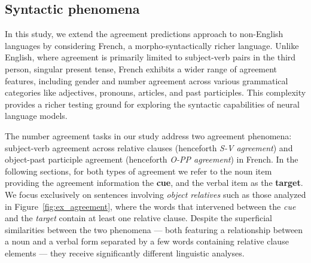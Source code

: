 \subsection{Syntactic phenomena} \label{sec:two_agreements}

In this study, we extend the agreement predictions approach to non-English languages by considering French, a morpho-syntactically richer language. Unlike English, where agreement is primarily limited to subject-verb pairs in the third person, singular present tense, French exhibits a wider range of agreement features, including gender and number agreement across various grammatical categories like adjectives, pronouns, articles, and past participles. This complexity provides a richer testing ground for exploring the syntactic capabilities of neural language models.



The number agreement tasks in our study address two agreement phenomena: subject-verb agreement across relative clauses (henceforth \textit{S-V agreement}) and object-past participle agreement (henceforth \textit{O-PP agreement}) in French. In the following sections, for both types of agreement we refer to the noun item providing the agreement information the \textbf{cue}, and the verbal item as the \textbf{target}. We focus exclusively on sentences involving \emph{object relatives} such as those analyzed in Figure~\ref{fig:ex_agreement}, where the words that intervened between the \textit{cue} and the \textit{target} contain at least one relative clause. Despite the superficial similarities between the two phenomena --- both featuring a relationship between a noun and a verbal form separated by a few words containing relative clause elements --- they receive significantly different linguistic analyses.

